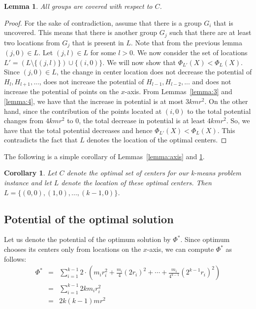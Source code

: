 \documentclass[11pt]{article}
\newtheorem{lemma}[theorem]{Lemma}
\newtheorem{corollary}[theorem]{Corollary}
\begin{document}
\begin{lemma}\label{lemma:distributed}
All groups are covered with respect to $C$.
\end{lemma}
\begin{proof}
For the sake of contradiction, assume that there is a group $G_i$ that is uncovered. 
This means that there is another group $G_j$ such that there are at least two locations from $G_j$ that is present in $L$.
Note that from the previous lemma $(j, 0) \in L$.
Let $(j, l) \in L$ for some $l > 0$.
We now consider the set of locations $L' = (L \setminus \{(j, l)\}) \cup \{(i, 0)\}$.
We will now show that $\Phi_{L'}(X) < \Phi_{L}(X)$.
Since $(j, 0) \in L$, the change in center location does not decrease the potential of $H_l, H_{l+1}, ...$, does not increase the potential of $H_{l-1}, H_{l-2}, ...$ and does not increase the potential of points on the $x$-axis. 
From Lemmas~\ref{lemma:3} and \ref{lemma:4}, we have that the increase in potential is at most $3kmr^2$. On the other hand, since the contribution of the points located at $(i, 0)$ to the total potential changes from $4kmr^2$ to $0$, the total decrease in potential is at least $4 k m r^2$. 
So, we have that the total potential decreases and hence $\Phi_{L'}(X) < \Phi_{L}(X)$. This contradicts the fact that $L$ denotes the location of the optimal centers.
\end{proof}

The following is a simple corollary of Lemmas~\ref{lemma:axis} and \ref{lemma:distributed}.

\begin{corollary}
Let $C$ denote the optimal set of centers for our k-means problem instance and let $L$ denote the location of these optimal centers. Then $L = \{(0, 0), (1, 0), ..., (k-1, 0)\}$.
\end{corollary}


\subsection{Potential of the optimal solution}
Let us denote the potential of the optimum solution by $\Phi^{*}$. 
Since optimum chooses its centers only from locations on the $x$-axis, we can compute $\Phi^{*}$ as follows:
\begin{eqnarray}\label{eqn:optimal-potential}
\Phi^{*} &=& \sum_{i=1}^{k-1} 2 \cdot (m_ir_i^2+\frac{m_i}{4}(2r_i)^2+\cdots+\frac{m_i}{4^{k-1}}(2^{k-1} r_i)^2) \nonumber\\
&=& \sum_{i=1}^{k-1} 2 k m_i r_i^2 \nonumber \\
&=& 2 k (k-1) m r^2
\end{eqnarray}
\end{document}
